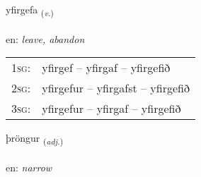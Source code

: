 \documentclass[frontgrid, backgrid]{flacards}\usepackage[]{graphicx}\usepackage[]{color}
\begin{document}
\renewcommand{\flhead}{\vskip5pt \fboxsep=0pt {\small\bfseries\footnotesize Sagnorð | Verb}}
\renewcommand{\fcfoot}{\vskip5pt \fboxsep=0pt \hspace{2pt}{\small\bfseries\footnotesize 2K}}

\renewcommand{\blhead}{\vskip5pt {\small\bfseries\footnotesize Sagnorð | Verb }}
\renewcommand{\bcfoot}{\vskip5pt \hspace{2pt}{\small\bfseries\footnotesize 2K}}


{yfirgefa \small{\textsubscript{(\textit{v.})}} \\[1ex] %
\textphonetic{[ɪːvɪrcɛva]} \\
en: \emph{leave, abandon} \\  [2ex]
\renewcommand*{\arraystretch}{0.8}
\begin{tabular}{p{1cm}l}
\textsc{1sg}: & yfirgef -- yfirgaf -- yfirgefið \\ 
\textsc{2sg}: & yfirgefur -- yfirgafst -- yfirgefið \\ 
\textsc{3sg}: & yfirgefur -- yfirgaf -- yfirgefið \\ 
\end{tabular}
}

\renewcommand{\flhead}{\vskip5pt \fboxsep=0pt {\small\bfseries\footnotesize Lýsingarorð | Adjective}}
\renewcommand{\fcfoot}{\vskip5pt \fboxsep=0pt \hspace{2pt}{\small\bfseries\footnotesize 2K}}

\renewcommand{\blhead}{\vskip5pt {\small\bfseries\footnotesize Lýsingarorð | Adjective }}
\renewcommand{\bcfoot}{\vskip5pt \hspace{2pt}{\small\bfseries\footnotesize 2K}}


{þröngur \small{\textsubscript{(\textit{adj.})}} \\[1ex] %
\textphonetic{[θrœiŋkʏr]} \\
en: \emph{narrow} \\  [2ex]
\renewcommand*{\arraystretch}{0.8}
}
\end{document}
